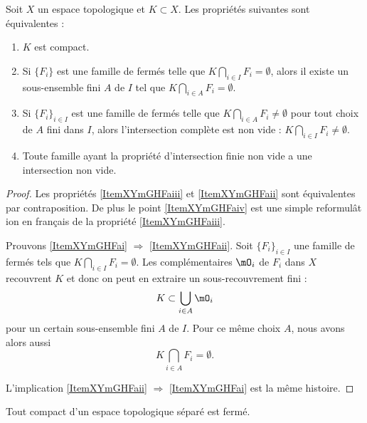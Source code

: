 \begin{proposition}\label{PropXKUMiCj}
    Soit \( X\) un espace topologique et \( K\subset X\). Les propriétés suivantes sont équivalentes :
    \begin{enumerate}
        \item\label{ItemXYmGHFai}
            \( K\) est compact.
        \item\label{ItemXYmGHFaii}
            Si \( \{ F_i \}\) est une famille de fermés telle que \( K\bigcap_{i\in I}F_i=\emptyset\), alors il existe un sous-ensemble fini \( A\) de \( I\) tel que \( K\bigcap_{i\in A}F_i=\emptyset\).
        \item\label{ItemXYmGHFaiii}
            Si \( \{ F_i \}_{i\in I}\) est une famille de fermés telle que \( K\bigcap_{i\in A}F_i\neq\emptyset\) pour tout choix de \( A\) fini dans \( I\), alors l'intersection complète est non vide : \( K\bigcap_{i\in I}F_i\neq\emptyset\).
        \item\label{ItemXYmGHFaiv}
            Toute famille ayant la propriété d'intersection finie non vide a une intersection non vide.
    \end{enumerate}
\end{proposition}

\begin{proof}
    Les propriétés \ref{ItemXYmGHFaiii} et \ref{ItemXYmGHFaii} sont équivalentes par contraposition. De plus le point \ref{ItemXYmGHFaiv} est une simple reformulât ion en français de la propriété \ref{ItemXYmGHFaiii}.

    Prouvons \ref{ItemXYmGHFai} \( \Rightarrow\) \ref{ItemXYmGHFaii}. Soit \( \{ F_i \}_{i\in I}\) une famille de fermés tels que \( K\bigcap_{i\in I}F_i=\emptyset\). Les complémentaires \( \mO_i\) de \( F_i\) dans \( X\) recouvrent \( K\) et donc on peut en extraire un sous-recouvrement fini :
    \begin{equation}
        K\subset\bigcup_{i\in A}\mO_i
    \end{equation}
    pour un certain sous-ensemble fini \( A\) de \( I\). Pour ce même choix \( A\), nous avons alors aussi
    \begin{equation}
        K\bigcap_{i\in A}F_i=\emptyset.
    \end{equation}

    L'implication \ref{ItemXYmGHFaii} \( \Rightarrow\) \ref{ItemXYmGHFai} est la même histoire.
\end{proof}

\begin{proposition}\label{PropUCUknHx}
    Tout compact d'un espace topologique séparé est fermé.
\end{proposition}

